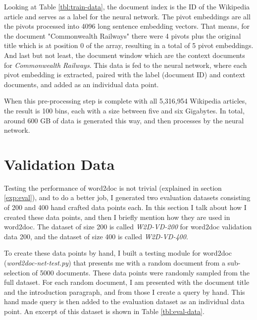 Looking at Table  \ref{tbl:train-data}, the document index is the ID of the Wikipedia article and serves as a label for the
neural network. The pivot embeddings are all the pivots processed into 4096 long sentence embedding vectors. That means, for
the document "Commonwealth Railways" there were 4
pivots plus the original title which is at position 0 of the array, resulting in a total of 5 pivot embeddings. And last but not
least, the document window which are the context documents for \textit{Commonwealth Railways}. This data is fed to the neural
network, where each pivot embedding is extracted, paired with the label (document ID) and context documents, and added as an
individual data point.

When this pre-processing step is complete with all 5,316,954 Wikipedia articles, the result is 100 bins, each with a size between
five and six Gigabytes. In total, around 600 GB of data is generated this way, and then processes by the neural network.


\section{Validation Data}
\label{data:eval}

Testing the performance of word2doc is not trivial (explained in section \ref{exp:eval}), and to do a better job, I generated two
evaluation datasets consisting of 200 and 400 hand crafted data points each. In this section I talk about how I created these data
points, and then I briefly mention how they are used in word2doc. The dataset of size 200 is called \textit{W2D-VD-200} for
word2doc validation data 200, and the dataset of size 400 is called \textit{W2D-VD-400}.

To create these data points by hand, I built a testing module for word2doc (\textit{word2doc-net-test.py}) that presents me
with a random document from a sub-selection of 5000 documents. These data points were randomly sampled from the full dataset.
For each random document, I am presented with the document title and the introduction paragraph, and from those I create a query
by hand. This hand made query is then added to the evaluation dataset as an individual data point. An excerpt of this dataset is
shown in Table \ref{tbl:eval-data}.

